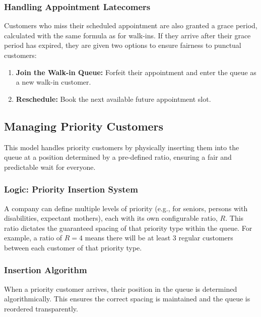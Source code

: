 \documentclass[12pt,a4paper]{report}
\begin{document}
\subsubsection{Handling Appointment Latecomers}
Customers who miss their scheduled appointment are also granted a grace period, calculated with the same formula as for walk-ins. If they arrive after their grace period has expired, they are given two options to ensure fairness to punctual customers:
\begin{enumerate}
    \item \textbf{Join the Walk-in Queue:} Forfeit their appointment and enter the queue as a new walk-in customer.
    \item \textbf{Reschedule:} Book the next available future appointment slot.
\end{enumerate}

\subsection{Managing Priority Customers}
This model handles priority customers by physically inserting them into the queue at a position determined by a pre-defined ratio, ensuring a fair and predictable wait for everyone.

\subsubsection{Logic: Priority Insertion System}
A company can define multiple levels of priority (e.g., for seniors, persons with disabilities, expectant mothers), each with its own configurable ratio, $R$. This ratio dictates the guaranteed spacing of that priority type within the queue. For example, a ratio of $R=4$ means there will be at least 3 regular customers between each customer of that priority type.

\subsubsection{Insertion Algorithm}
When a priority customer arrives, their position in the queue is determined algorithmically. This ensures the correct spacing is maintained and the queue is reordered transparently.
\end{document}

